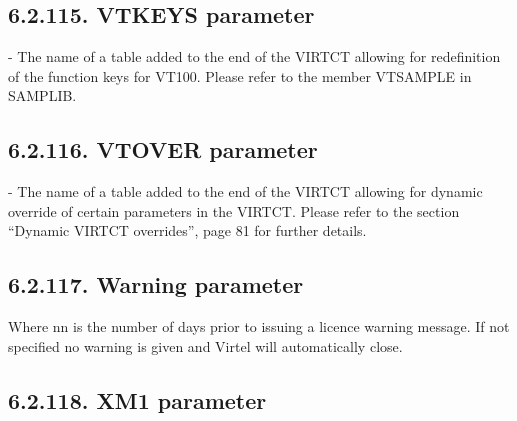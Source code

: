 \documentclass[letterpaper,10pt,english]{sphinxmanual}
\begin{document}
\subsection{6.2.115. VTKEYS parameter}
\label{\detokenize{Installation_Guide:vtkeys-parameter}}
\begin{sphinxVerbatim}[commandchars=\\\{\}]
 
\end{sphinxVerbatim}

 - The name of a table added to the end of the VIRTCT allowing for redefinition of the function keys for VT100. Please refer to the member VTSAMPLE in SAMPLIB.


\subsection{6.2.116. VTOVER parameter}
\label{\detokenize{Installation_Guide:vtover-parameter}}
\begin{sphinxVerbatim}[commandchars=\\\{\}]
 
\end{sphinxVerbatim}

 - The name of a table added to the end of the VIRTCT allowing for dynamic override of certain parameters in the VIRTCT. Please refer to the section “Dynamic VIRTCT overrides”, page 81 for further details.


\subsection{6.2.117. Warning parameter}
\label{\detokenize{Installation_Guide:warning-parameter}}
\begin{sphinxVerbatim}[commandchars=\\\{\}]
\end{sphinxVerbatim}

Where nn is the number of days prior to issuing a licence warning message. If not specified no warning is given and Virtel will automatically close.


\subsection{6.2.118. XM1 parameter}
\label{\detokenize{Installation_Guide:xm1-parameter}}
\begin{sphinxVerbatim}[commandchars=\\\{\}]
   
\PYG{p}{[}\PYG{p}{]}
\end{sphinxVerbatim}
\end{document}
